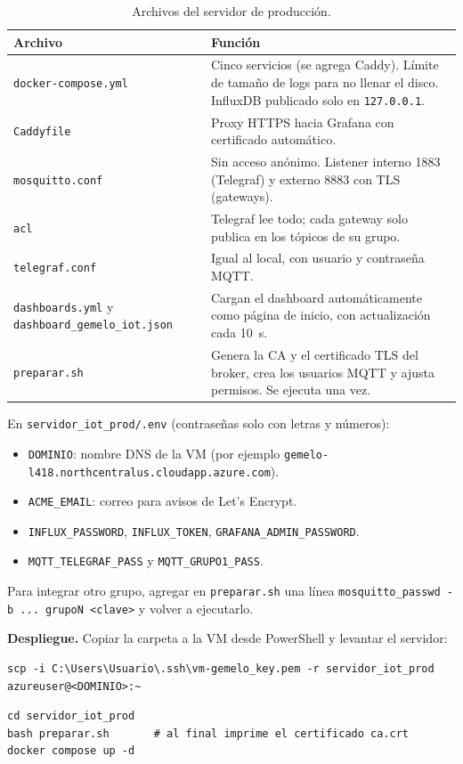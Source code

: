 \documentclass[11pt,a4paper]{article}
\newcommand{\arch}[1]{\texttt{#1}}
\begin{document}
\begin{table}[H]
\centering
\caption{Archivos del servidor de producci\'on.}
\begin{tabularx}{\textwidth}{@{}lX@{}}
\toprule
\textbf{Archivo} & \textbf{Funci\'on} \\
\midrule
\arch{docker-compose.yml} & Cinco servicios (se agrega Caddy). L\'imite de tama\~no de logs
para no llenar el disco. InfluxDB publicado solo en \texttt{127.0.0.1}. \\
\arch{Caddyfile} & Proxy HTTPS hacia Grafana con certificado autom\'atico. \\
\arch{mosquitto.conf} & Sin acceso an\'onimo. Listener interno 1883 (Telegraf) y externo
8883 con TLS (gateways). \\
\arch{acl} & Telegraf lee todo; cada gateway solo publica en los t\'opicos de su grupo. \\
\arch{telegraf.conf} & Igual al local, con usuario y contrase\~na MQTT. \\
\arch{dashboards.yml} y \arch{dashboard\_gemelo\_iot.json} & Cargan el dashboard
autom\'aticamente como p\'agina de inicio, con actualizaci\'on cada 10~s. \\
\arch{preparar.sh} & Genera la CA y el certificado TLS del broker, crea los usuarios MQTT y
ajusta permisos. Se ejecuta una vez. \\
\bottomrule
\end{tabularx}
\end{table}

\begin{completar}
En \arch{servidor\_iot\_prod/.env} (contrase\~nas solo con letras y n\'umeros):
\begin{itemize}
  \item \texttt{DOMINIO}: nombre DNS de la VM (por ejemplo
        \texttt{gemelo-l418.northcentralus.cloudapp.azure.com}).
  \item \texttt{ACME\_EMAIL}: correo para avisos de Let's Encrypt.
  \item \texttt{INFLUX\_PASSWORD}, \texttt{INFLUX\_TOKEN}, \texttt{GRAFANA\_ADMIN\_PASSWORD}.
  \item \texttt{MQTT\_TELEGRAF\_PASS} y \texttt{MQTT\_GRUPO1\_PASS}.
\end{itemize}
Para integrar otro grupo, agregar en \arch{preparar.sh} una l\'inea
\texttt{mosquitto\_passwd -b ... grupoN <clave>} y volver a ejecutarlo.
\end{completar}

\textbf{Despliegue.} Copiar la carpeta a la VM desde PowerShell y levantar el servidor:
\begin{lstlisting}[style=bash]
scp -i C:\Users\Usuario\.ssh\vm-gemelo_key.pem -r servidor_iot_prod azureuser@<DOMINIO>:~
\end{lstlisting}
\begin{lstlisting}[style=bash]
cd servidor_iot_prod
bash preparar.sh       # al final imprime el certificado ca.crt
docker compose up -d
\end{lstlisting}
\end{document}
